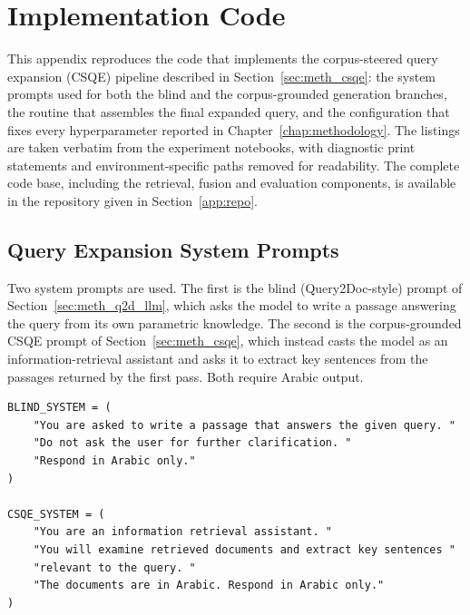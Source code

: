 \chapter{Implementation Code}
\setcounter{page}{1}
\label{app:code}

This appendix reproduces the code that implements the corpus-steered query
expansion (CSQE) pipeline described in Section~\ref{sec:meth_csqe}: the system
prompts used for both the blind and the corpus-grounded generation branches, the
routine that assembles the final expanded query, and the configuration that fixes
every hyperparameter reported in Chapter~\ref{chap:methodology}. The listings are
taken verbatim from the experiment notebooks, with diagnostic print statements and
environment-specific paths removed for readability. The complete code base,
including the retrieval, fusion and evaluation components, is available in the
repository given in Section~\ref{app:repo}.

\section{Query Expansion System Prompts}
\label{app:code_prompts}

Two system prompts are used. The first is the blind (Query2Doc-style) prompt of
Section~\ref{sec:meth_q2d_llm}, which asks the model to write a passage answering
the query from its own parametric knowledge. The second is the corpus-grounded
CSQE prompt of Section~\ref{sec:meth_csqe}, which instead casts the model as an
information-retrieval assistant and asks it to extract key sentences from the
passages returned by the first pass. Both require Arabic output.

\begin{codeblock}
\begin{lstlisting}[caption={Blind and corpus-grounded system prompts.},label={lst:systems}]
BLIND_SYSTEM = (
    "You are asked to write a passage that answers the given query. "
    "Do not ask the user for further clarification. "
    "Respond in Arabic only."
)

CSQE_SYSTEM = (
    "You are an information retrieval assistant. "
    "You will examine retrieved documents and extract key sentences "
    "relevant to the query. "
    "The documents are in Arabic. Respond in Arabic only."
)
\end{lstlisting}
\end{codeblock}


